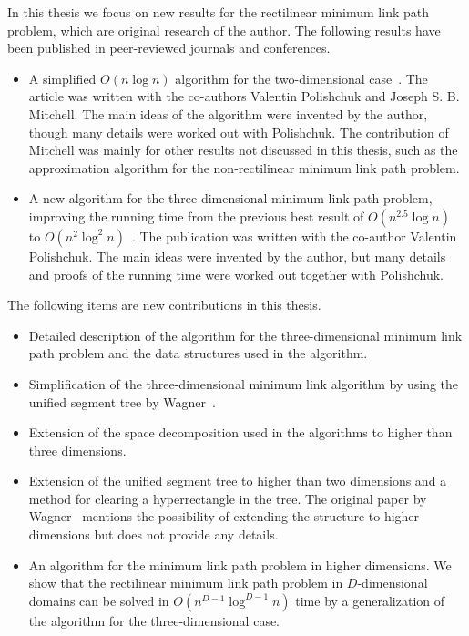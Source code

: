 \documentclass[english,gradu]{tktltiki2018}
\begin{document}
In this thesis we focus on new results for the rectilinear minimum link path problem, which are original research of the author.
The following results have been published in peer-reviewed journals and conferences.
\begin{itemize}
\item A simplified $O(n\log n)$ algorithm for the two-dimensional case~\cite{revisited}.
The article was written with the co-authors Valentin Polishchuk and Joseph S. B. Mitchell.
The main ideas of the algorithm were invented by the author, though many details were worked out with Polishchuk.
The contribution of Mitchell was mainly for other results not discussed in this thesis, such as the approximation algorithm for the non-rectilinear minimum link path problem.
\item A new algorithm for the three-dimensional minimum link path problem, improving the running time from the previous best result of $O(n^{2.5}\log n)$ to $O(n^2\log^2 n)$~\cite{restricted}.
The publication was written with the co-author Valentin Polishchuk.
The main ideas were invented by the author, but many details and proofs of the running time were worked out together with Polishchuk.
\end{itemize}

The following items are new contributions in this thesis.

\begin{itemize}
\item Detailed description of the algorithm for the three-dimensional minimum link path problem and the data structures used in the algorithm.
\item Simplification of the three-dimensional minimum link algorithm by using the unified segment tree by Wagner~\cite{unified}.
\item Extension of the space decomposition used in the algorithms to higher than three dimensions.
\item Extension of the unified segment tree to higher than two dimensions and a method for clearing a hyperrectangle in the tree.
	The original paper by Wagner~\cite{unified} mentions the possibility of extending the structure to higher dimensions but does not provide any details.
\item An algorithm for the minimum link path problem in higher dimensions.
	We show that the rectilinear minimum link path problem in $D$-dimensional domains can be solved in $O(n^{D-1}\log^{D-1} n)$ time by a generalization of the algorithm for the three-dimensional case.
\end{itemize}
\end{document}
